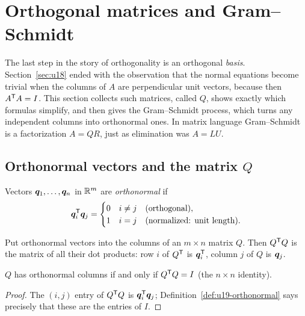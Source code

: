 \section{Orthogonal matrices and Gram--Schmidt}\label{sec:u19}

The last step in the story of orthogonality is an orthogonal \emph{basis}. Section~\ref{sec:u18}
ended with the observation that the normal equations become trivial when the columns of $A$
are perpendicular unit vectors, because then $A^{\mathsf{T}} A=I$. This section collects such matrices,
called $Q$, shows exactly which formulas simplify, and then gives the Gram--Schmidt process,
which turns any independent columns into orthonormal ones. In matrix language Gram--Schmidt is
a factorization $A=QR$, just as elimination was $A=LU$.

\subsection{Orthonormal vectors and the matrix \texorpdfstring{$Q$}{Q}}

\begin{definition}\label{def:u19-orthonormal}
Vectors $\boldsymbol{q}_1,\dots,\boldsymbol{q}_n$ in $\mathbb{R}^m$ are \emph{orthonormal} if
\[
  \boldsymbol{q}_i^{\mathsf{T}}\boldsymbol{q}_j=\begin{cases}0 & i\neq j\quad\text{(orthogonal)},\\ 1 & i=j\quad\text{(normalized: unit length)}.\end{cases}
\]
\end{definition}

Put orthonormal vectors into the columns of an $m\times n$ matrix $Q$. Then $Q^{\mathsf{T}} Q$ is the
matrix of all their dot products: row $i$ of $Q^{\mathsf{T}}$ is $\boldsymbol{q}_i^{\mathsf{T}}$, column $j$ of $Q$ is
$\boldsymbol{q}_j$.

\begin{proposition}\label{prop:u19-qtq}
$Q$ has orthonormal columns if and only if $Q^{\mathsf{T}} Q=I$ (the $n\times n$ identity).
\end{proposition}

\begin{proof}
The $(i,j)$ entry of $Q^{\mathsf{T}} Q$ is $\boldsymbol{q}_i^{\mathsf{T}}\boldsymbol{q}_j$; Definition~\ref{def:u19-orthonormal}
says precisely that these are the entries of $I$.
\end{proof}

